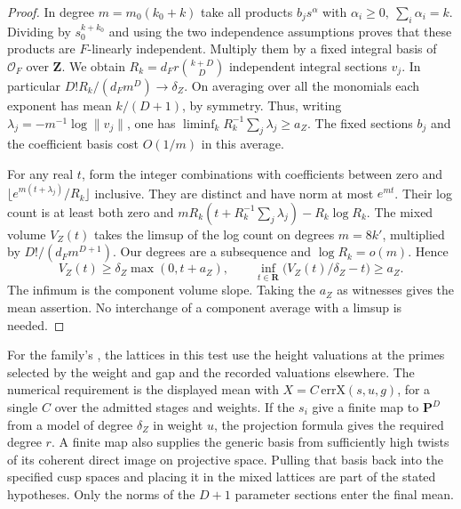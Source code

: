 \begin{proof}
In degree \(m=m_0(k_0+k)\) take all products \(b_j s^\alpha\) with
\(\alpha_i\ge0,\ \sum_i\alpha_i=k\). Dividing by \(s_0^{k+k_0}\)
and using the two independence assumptions proves that these products
are \(F\)-linearly independent. Multiply them by a fixed integral
basis of \(\mathcal O_F\) over \(\mathbf Z\). We obtain
\(R_k=d_F r\binom{k+D}{D}\) independent integral sections \(v_j\).
In particular \(D!R_k/(d_Fm^D)\to\delta_Z\).
On averaging over all the monomials each exponent has mean
\(k/(D+1)\), by symmetry. Thus, writing
\(\lambda_j=-m^{-1}\log\|v_j\|\), one has
\(\liminf_k R_k^{-1}\sum_j\lambda_j\ge a_Z\).
The fixed sections \(b_j\) and the coefficient basis cost \(O(1/m)\)
in this average.

For any real \(t\), form the integer combinations with coefficients
between zero and \(\lfloor e^{m(t+\lambda_j)}/R_k\rfloor\) inclusive.
They are distinct and have norm at most \(e^{mt}\). Their log count
is at least both zero and
\(mR_k(t+R_k^{-1}\sum_j\lambda_j)-R_k\log R_k\).
The mixed volume \(V_Z(t)\) takes the limsup of the log count on
degrees \(m=8k'\), multiplied by \(D!/(d_Fm^{D+1})\).
Our degrees are a subsequence and \(\log R_k=o(m)\). Hence
\[
 V_Z(t)\ge\delta_Z\max(0,t+a_Z),\qquad
 \inf_{t\in\mathbf R}\bigl(V_Z(t)/\delta_Z-t\bigr)\ge a_Z .
\]
The infimum is the component volume slope. Taking the \(a_Z\) as
witnesses gives the mean assertion. No interchange of a component
average with a limsup is needed.
\end{proof}

For the family's ,
the lattices in this test use the height valuations at the primes
selected by the weight and gap and the recorded valuations elsewhere.
The numerical requirement is the displayed mean with
\(X=C\,\mathrm{errX}(s,u,g)\), for a single \(C\) over the admitted
stages and weights. If the \(s_i\) give a finite map to
\(\mathbf P^D\) from a model of degree \(\delta_Z\) in weight \(u\),
the projection formula gives the required degree \(r\).
A finite map also supplies the generic basis from sufficiently high
twists of its coherent direct image on projective space. Pulling that
basis back into the specified cusp spaces and placing it in the mixed
lattices are part of the stated hypotheses. Only the norms of the
\(D+1\) parameter sections enter the final mean.


